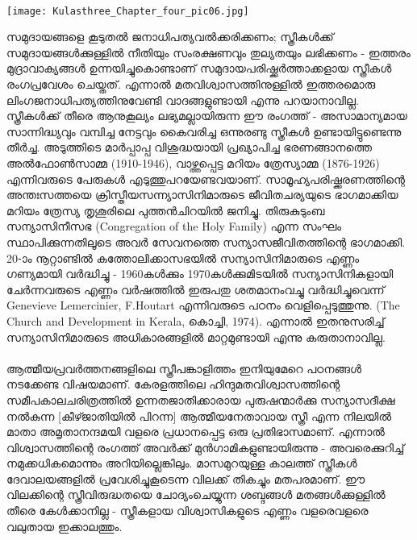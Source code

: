 \label{ch4box2} %
\begin{tcolorbox}[%
 breakable, %
  arc=0mm, 
  left=1pt, right = 1pt, 
  boxrule=0mm,
  colback = {blue!10}, %
] 
\paragraph{}
\begin{center}
\texttt{[image: Kulasthree\_Chapter\_four\_pic06.jpg]}
\end{center}

സമുദായങ്ങളെ കൂടുതൽ ജനാധിപത്യവൽക്കരിക്കണം; സ്ത്രീകൾക്ക് സമുദായങ്ങൾക്കുള്ളിൽ നീതിയും സംരക്ഷണവും തുല്യതയും ലഭിക്കണം - ഇത്തരം മുദ്രാവാക്യങ്ങൾ ഉന്നയിച്ചുകൊണ്ടാണ് സമുദായപരിഷ്ക്കർത്താക്കളായ സ്ത്രീകൾ രംഗപ്രവേശം ചെയ്തത്. എന്നാൽ മതവിശ്വാസത്തിനുള്ളിൽ ഇത്തരമൊരു ലിംഗജനാധിപത്യത്തിനുവേണ്ടി വാദങ്ങളുണ്ടായി എന്നു പറയാനാവില്ല. സ്ത്രീകൾക്ക് തീരെ ആനുകൂല്യം ലഭ്യമല്ലായിരുന്ന ഈ രംഗത്ത് - അസാമാന്യമായ സാന്നിദ്ധ്യവും വമ്പിച്ച നേട്ടവും കൈവരിച്ച ഒന്നുരണ്ടു സ്ത്രീകൾ ഉണ്ടായിട്ടുണ്ടെന്നു തീർച്ച. അടുത്തിടെ മാർപ്പാപ്പ വിശുദ്ധയായി പ്രഖ്യാപിച്ച ഭരണങ്ങാനത്തെ അൽഫോൺസാമ്മ (1910-1946), വാഴ്ത്തപ്പെട്ട മറിയം ത്രേസ്യാമ്മ (1876-1926) എന്നിവരുടെ പേരുകൾ എടുത്തുപറയേണ്ടവയാണ്. സാമൂഹ്യപരിഷ്ക്കരണത്തിന്റെ അന്തഃസത്തയെ ക്രിസ്തീയസന്ന്യാസിനിമാരുടെ ജീവിതചര്യയുടെ ഭാഗമാക്കിയ മറിയം ത്രേസ്യ തൃശൂരിലെ പുത്തൻചിറയിൽ ജനിച്ചു. തിരുകുടുംബ സന്യാസിനീസഭ (Congregation of the Holy Family) എന്ന സംഘം സ്ഥാപിക്കുന്നതിലൂടെ അവർ സേവനത്തെ സന്യാസജീവിതത്തിന്റെ ഭാഗമാക്കി. 20-ാം നൂറ്റാണ്ടിൽ കത്തോലിക്കാസഭയിൽ സന്യാസിനിമാരുടെ എണ്ണം ഗണ്യമായി വർദ്ധിച്ചു - 1960കൾക്കും 1970കൾക്കുമിടയിൽ സന്യാസിനികളായി ചേർന്നവരുടെ എണ്ണം വർഷത്തിൽ ഇരുപതു ശതമാനംവച്ചു വർദ്ധിച്ചുവെന്ന് Genevieve Lemercinier, F.Houtart എന്നിവരുടെ പഠനം വെളിപ്പെടുത്തുന്നു. (The Church and Development in Kerala, കൊച്ചി, 1974). എന്നാൽ ഇതനുസരിച്ച് സന്യാസിനിമാരുടെ അധികാരങ്ങളിൽ മാറ്റമുണ്ടായി എന്നു കരുതാനാവില്ല.

\paragraph{}

ആത്മീയപ്രവർത്തനങ്ങളിലെ സ്ത്രീപങ്കാളിത്തം ഇനിയുമേറെ പഠനങ്ങൾ നടക്കേണ്ട വിഷയമാണ്. കേരളത്തിലെ ഹിന്ദുമതവിശ്വാസത്തിന്റെ സമീപകാലചരിത്രത്തിൽ ഉന്നതജാതിക്കാരായ പുരുഷന്മാർക്കു സന്യാസദീക്ഷ നൽകുന്ന [കീഴ്ജാതിയിൽ പിറന്ന] ആത്മീയനേതാവായ സ്ത്രീ എന്ന നിലയിൽ മാതാ അമൃതാനന്ദമയി വളരെ പ്രധാനപ്പെട്ട ഒരു പ്രതിഭാസമാണ്. എന്നാൽ വിശ്വാസത്തിന്റെ രംഗത്ത് അവർക്ക് മുൻഗാമികളുണ്ടായിരുന്നു - അവരെക്കുറിച്ച് നമുക്കധികമൊന്നും അറിയില്ലെങ്കിലും. മാസമുറയുള്ള കാലത്ത് സ്ത്രീകൾ ദേവാലയങ്ങളിൽ പ്രവേശിച്ചുകൂടെന്ന വിലക്ക് തികച്ചും മതപരമാണ്. ഈ വിലക്കിന്റെ സ്ത്രീവിരുദ്ധതയെ ചോദ്യംചെയ്യുന്ന ശബ്ദങ്ങൾ മതങ്ങൾക്കുള്ളിൽ തീരെ കേൾക്കാനില്ല - സ്ത്രീകളായ വിശ്വാസികളുടെ എണ്ണം വളരെവളരെ വലുതായ ഇക്കാലത്തും.
\end{tcolorbox}

